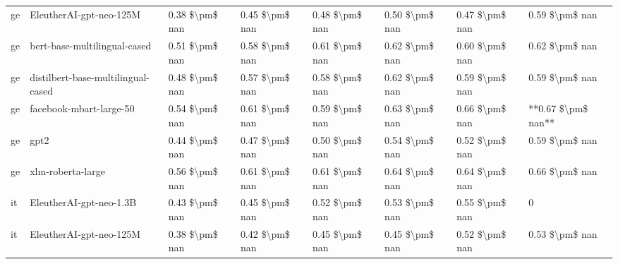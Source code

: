 \begin{tabular}{llllllll}
      ge &            EleutherAI-gpt-neo-125M & 0.38 \$\textbackslash pm\$ nan &            0.45 \$\textbackslash pm\$ nan &        0.48 \$\textbackslash pm\$ nan &         0.50 \$\textbackslash pm\$ nan &                          0.47 \$\textbackslash pm\$ nan &     0.59 \$\textbackslash pm\$ nan \\
      ge &       bert-base-multilingual-cased & 0.51 \$\textbackslash pm\$ nan &            0.58 \$\textbackslash pm\$ nan &        0.61 \$\textbackslash pm\$ nan &         0.62 \$\textbackslash pm\$ nan &                          0.60 \$\textbackslash pm\$ nan &     0.62 \$\textbackslash pm\$ nan \\
      ge & distilbert-base-multilingual-cased & 0.48 \$\textbackslash pm\$ nan &            0.57 \$\textbackslash pm\$ nan &        0.58 \$\textbackslash pm\$ nan &         0.62 \$\textbackslash pm\$ nan &                          0.59 \$\textbackslash pm\$ nan &     0.59 \$\textbackslash pm\$ nan \\
      ge &            facebook-mbart-large-50 & 0.54 \$\textbackslash pm\$ nan &            0.61 \$\textbackslash pm\$ nan &        0.59 \$\textbackslash pm\$ nan &         0.63 \$\textbackslash pm\$ nan &                          0.66 \$\textbackslash pm\$ nan & **0.67 \$\textbackslash pm\$ nan** \\
      ge &                               gpt2 & 0.44 \$\textbackslash pm\$ nan &            0.47 \$\textbackslash pm\$ nan &        0.50 \$\textbackslash pm\$ nan &         0.54 \$\textbackslash pm\$ nan &                          0.52 \$\textbackslash pm\$ nan &     0.59 \$\textbackslash pm\$ nan \\
      ge &                  xlm-roberta-large & 0.56 \$\textbackslash pm\$ nan &            0.61 \$\textbackslash pm\$ nan &        0.61 \$\textbackslash pm\$ nan &         0.64 \$\textbackslash pm\$ nan &                          0.64 \$\textbackslash pm\$ nan &     0.66 \$\textbackslash pm\$ nan \\
      it &            EleutherAI-gpt-neo-1.3B & 0.43 \$\textbackslash pm\$ nan &            0.45 \$\textbackslash pm\$ nan &        0.52 \$\textbackslash pm\$ nan &         0.53 \$\textbackslash pm\$ nan &                          0.55 \$\textbackslash pm\$ nan &                  0 \\
      it &            EleutherAI-gpt-neo-125M & 0.38 \$\textbackslash pm\$ nan &            0.42 \$\textbackslash pm\$ nan &        0.45 \$\textbackslash pm\$ nan &         0.45 \$\textbackslash pm\$ nan &                          0.52 \$\textbackslash pm\$ nan &     0.53 \$\textbackslash pm\$ nan \\

\end{tabular}
